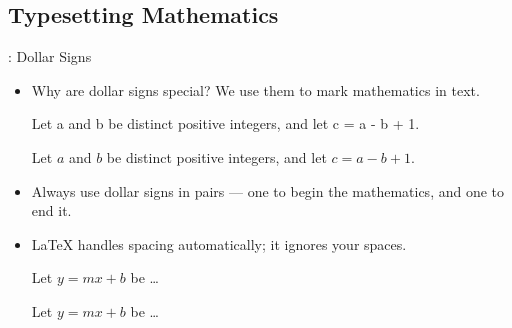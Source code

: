 \documentclass{beamer}
\begin{document}
    \subsection{Typesetting Mathematics}
    \begin{frame}[fragile]{\insertsubsection{}: Dollar Signs}
    \begin{itemize}
    \item Why are dollar signs \keystrokebftt{\$} special? We use them to mark mathematics in text.\\[1ex]
    \begin{exampletwouptiny}
    Let a and b be distinct positive
    integers, and let c = a - b + 1.
    
    Let $a$ and $b$ be distinct positive
    integers, and let $c = a - b + 1$.
    \end{exampletwouptiny}
    \item Always use dollar signs in pairs --- one to begin the mathematics, and one
    to end it.
    \item \LaTeX{} handles spacing automatically; it ignores your spaces.
    \begin{exampletwouptiny}
    Let $y=mx+b$ be \ldots
    
    Let $y = m x + b$ be \ldots
    \end{exampletwouptiny}
    \end{itemize}
    \end{frame}
    
\end{document}
